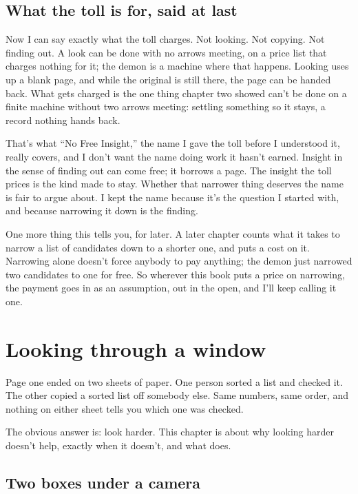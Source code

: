 \documentclass[11pt,twoside]{article}
\theoremstyle{thielethm}
\theoremstyle{thieledef}
\theoremstyle{thieledef}
\theoremstyle{thieledef}
\theoremstyle{thielethm}
\theoremstyle{thieleobs}
\theoremstyle{thielethm}
\begin{document}
\subsection{What the toll is for, said at last}

Now I can say exactly what the toll charges. Not looking. Not copying. Not finding out. A look can be done with no arrows meeting, on a price list that charges nothing for it; the demon is a machine where that happens. Looking uses up a blank page, and while the original is still there, the page can be handed back. What gets charged is the one thing chapter two showed can't be done on a finite machine without two arrows meeting: settling something so it stays, a record nothing hands back.

That's what ``No Free Insight,'' the name I gave the toll before I understood it, really covers, and I don't want the name doing work it hasn't earned. Insight in the sense of finding out can come free; it borrows a page. The insight the toll prices is the kind made to stay. Whether that narrower thing deserves the name is fair to argue about. I kept the name because it's the question I started with, and because narrowing it down is the finding.

One more thing this tells you, for later. A later chapter counts what it takes to narrow a list of candidates down to a shorter one, and puts a cost on it. Narrowing alone doesn't force anybody to pay anything; the demon just narrowed two candidates to one for free. So wherever this book puts a price on narrowing, the payment goes in as an assumption, out in the open, and I'll keep calling it one.

\section{Looking through a window}
\label{sec:window}

Page one ended on two sheets of paper. One person sorted a list and checked it. The other copied a sorted list off somebody else. Same numbers, same order, and nothing on either sheet tells you which one was checked.

The obvious answer is: look harder. This chapter is about why looking harder doesn't help, exactly when it doesn't, and what does.

\subsection{Two boxes under a camera}
\end{document}
